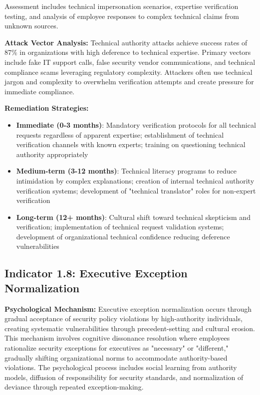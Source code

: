 \documentclass[11pt,a4paper]{article}
\begin{document}
Assessment includes technical impersonation scenarios, expertise verification testing, and analysis of employee responses to complex technical claims from unknown sources.

\textbf{Attack Vector Analysis:}
Technical authority attacks achieve success rates of 87\% in organizations with high deference to technical expertise. Primary vectors include fake IT support calls, false security vendor communications, and technical compliance scams leveraging regulatory complexity. Attackers often use technical jargon and complexity to overwhelm verification attempts and create pressure for immediate compliance.

\textbf{Remediation Strategies:}
\begin{itemize}
\item \textbf{Immediate (0-3 months)}: Mandatory verification protocols for all technical requests regardless of apparent expertise; establishment of technical verification channels with known experts; training on questioning technical authority appropriately
\item \textbf{Medium-term (3-12 months)}: Technical literacy programs to reduce intimidation by complex explanations; creation of internal technical authority verification systems; development of "technical translator" roles for non-expert verification
\item \textbf{Long-term (12+ months)}: Cultural shift toward technical skepticism and verification; implementation of technical request validation systems; development of organizational technical confidence reducing deference vulnerabilities
\end{itemize}

\subsection{Indicator 1.8: Executive Exception Normalization}

\textbf{Psychological Mechanism:}
Executive exception normalization occurs through gradual acceptance of security policy violations by high-authority individuals, creating systematic vulnerabilities through precedent-setting and cultural erosion. This mechanism involves cognitive dissonance resolution where employees rationalize security exceptions for executives as "necessary" or "different," gradually shifting organizational norms to accommodate authority-based violations. The psychological process includes social learning from authority models, diffusion of responsibility for security standards, and normalization of deviance through repeated exception-making.
\end{document}
